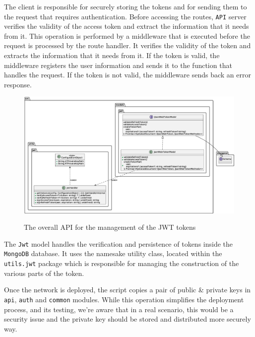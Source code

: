 \documentclass{scrartcl}
\begin{document}
The client is responsible for securely storing the tokens and for sending them to the request that requires authentication. Before accessing the routes, \texttt{API} server verifies the validity of the access token and extract 
the information that it needs from it.
This operation is performed by a middleware that is executed before the request is processed by the route handler. It verifies the validity of the token and extracts the information that it needs from it. If the token is valid, the middleware registers the user information and sends it to the function that handles the request. If the token is not valid, the middleware sends back an error response.


\begin{figure}
    \centering
    \includegraphics[width=\linewidth]{figures/jwt-api.eps}
    \label{fig:jwt-packages-api} 
    \caption{The overall API for the management of the JWT tokens}
\end{figure}

The \texttt{Jwt} model handles the verification and persistence of tokens inside the \texttt{MongoDB} database. It uses the namesake utility class, located within the \texttt{utils.jwt} package which is responsible for managing the construction of the various parts of the token.

\begin{warn}
    Once the network is deployed, the script copies a pair of public \& private keys in \texttt{api}, \texttt{auth} and \texttt{common} modules. While this operation simplifies the deployment process, and its testing, we're aware that in a real scenario, this would be a security issue and the private key should be stored and distributed more securely way.
\end{warn}
\end{document}
